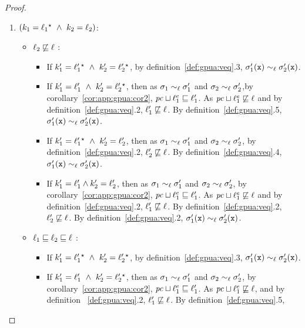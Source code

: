 \begin{proof}
\begin{enumerate}
\begin{itemize}
\begin{enumerate}
\item $(k_1 =   \ell_1 {}^\star   ~\wedge~k_2 = 
  \ell_2)$: 
\begin{itemize}
\item $\ell_2 \not\sqsubseteq \ell$ : 
 \begin{itemize}
\item  If $k_1' =  \ell_1'{}^\star   ~\wedge~k_2' =
 \ell_2'{}^\star  $, by definition~\ref{def:gpua:veq}.3,
$\sigma_1'(\texttt{x})   \sim_\ell \sigma_2'(\texttt{x})$.
\item If $k_1' = \ell_1' ~\wedge~k_2' =  \ell_2'{}^\star  $, then as $\sigma_1
  \sim_\ell \sigma_1'$ and $\sigma_2 \sim_\ell \sigma_2'$,by
  corollary~\ref{cor:app:gpua:cor2},  $\mathit{pc} \sqcup \ell^e_1\sqsubseteq \ell_1'$. As $\mathit{pc} \sqcup \ell^e_1 \not\sqsubseteq \ell$ and by
  definition~\ref{def:gpua:veq}.2, $\ell_1' \not\sqsubseteq \ell$.  By
  definition~\ref{def:gpua:veq}.5, $\sigma_1'(\texttt{x}) 
  \sim_\ell \sigma_2'(\texttt{x})$.
\item  If $k_1' =  \ell_1'{}^\star   ~\wedge~k_2' = \ell_2'$, then as $\sigma_1
  \sim_\ell \sigma_1'$ and $\sigma_2 \sim_\ell \sigma_2'$, by
  definition~\ref{def:gpua:veq}.2, $\ell_2' \not\sqsubseteq \ell$.
  By definition~\ref{def:gpua:veq}.4, $\sigma_1'(\texttt{x})
  \sim_\ell \sigma_2'(\texttt{x})$.
\item If $k_1' = \ell_1' \wedge k_2' = \ell_2'$, then as $\sigma_1
  \sim_\ell \sigma_1'$ and $\sigma_2 \sim_\ell \sigma_2'$, by
  corollary~\ref{cor:app:gpua:cor2},  $\mathit{pc} \sqcup \ell^e_1\sqsubseteq \ell_1'$. As $\mathit{pc} \sqcup \ell^e_1 \not\sqsubseteq \ell$ and by
  definition~\ref{def:gpua:veq}.2, $\ell_1' \not\sqsubseteq \ell$. By
  definition~\ref{def:gpua:veq}.2, $\ell_2' \not\sqsubseteq \ell$.
  By definition~\ref{def:gpua:veq}.2, $\sigma_1'(\texttt{x})
  \sim_\ell \sigma_2'(\texttt{x})$.
 \end{itemize}
\item $\ell_1 \sqsubseteq \ell_2 \sqsubseteq \ell$ : 
 \begin{itemize}
\item  If $k_1' =  \ell_1'{}^\star   ~\wedge~k_2' =
 \ell_2'{}^\star  $, by definition~\ref{def:gpua:veq}.3,
$\sigma_1'(\texttt{x})   \sim_\ell \sigma_2'(\texttt{x})$.
\item If $k_1' = \ell_1' ~\wedge~k_2' =  \ell_2'{}^\star  $, then as $\sigma_1
  \sim_\ell \sigma_1'$ and $\sigma_2 \sim_\ell \sigma_2'$, by
  corollary~\ref{cor:app:gpua:cor2},  $\mathit{pc} \sqcup \ell^e_1 \sqsubseteq \ell_1'$. As $\mathit{pc} \sqcup
  \ell^e_1 \not\sqsubseteq \ell$, and by definition ~\ref{def:gpua:veq}.2,
  $\ell_1' \not\sqsubseteq \ell$. By definition~\ref{def:gpua:veq}.5,

\end{itemize}
\end{itemize}
\end{enumerate}
\end{itemize}
\end{enumerate}
\end{proof}
